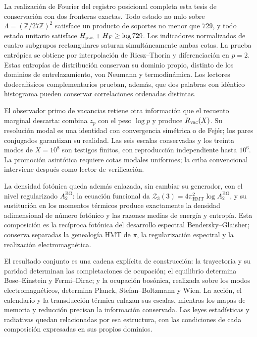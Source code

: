 La realización de Fourier del registro posicional completa esta tesis de
conservación con dos fronteras exactas. Todo estado no nulo sobre
\(\Lambda=(\mathbb Z/27\mathbb Z)^2\) satisface un producto de soportes
no menor que \(729\), y todo estado unitario satisface
\(H_{\rm pos}+H_F\ge\log729\). Los indicadores normalizados de cuatro
subgrupos rectangulares saturan simultáneamente ambas cotas. La prueba
entrópica se obtiene por interpolación de Riesz--Thorin y diferenciación
en \(p=2\). Estas entropías de distribución conservan su dominio propio,
distinto de los dominios de entrelazamiento, von Neumann y termodinámica.
Los lectores dodecafásicos complementarios prueban, además, que dos
palabras con idéntico histograma pueden conservar correlaciones ordenadas
distintas.

El observador primo de vacancias retiene otra información que el recuento
marginal descarta: combina \(z_p\) con el peso \(\log p\) y produce
\(R_{\rm vac}(X)\). Su resolución modal es una identidad con convergencia
simétrica o de Fejér; los pares conjugados garantizan su realidad. Las seis
escalas conservadas y los treinta modos de \(X=10^8\) son testigos finitos,
con reproducción independiente hasta \(10^6\). La promoción asintótica
requiere cotas modales uniformes; la criba convencional interviene después
como lector de verificación.

La densidad fotónica queda además enlazada, sin cambiar su generador, con
el nivel regularizado \(A_2^{\mathrm{BG}}\): la ecuación funcional da
\(\mathcal Z_3(3)=4\pi_{\mathrm{HMT}}^2\log A_2^{\mathrm{BG}}\), y su
sustitución en los momentos térmicos produce exactamente la densidad
adimensional de número fotónico y las razones medias de energía y entropía.
Esta composición es la recíproca fotónica del desarrollo espectral
Bendersky--Glaisher; conserva separadas la genealogía HMT de \(\pi\), la
regularización espectral y la realización electromagnética.


El resultado conjunto es una cadena explícita de construcción:
la trayectoria y su paridad determinan las completaciones de ocupación;
el equilibrio determina Bose--Einstein y Fermi--Dirac; y la ocupación
bosónica, realizada sobre los modos electromagnéticos, determina
Planck, Stefan--Boltzmann y Wien. La acción, el calendario y la
transducción térmica enlazan sus escalas, mientras los mapas de memoria
y reducción precisan la información conservada. Las leyes estadísticas
y radiativas quedan relacionadas por esa estructura, con las
condiciones de cada composición expresadas en sus propios dominios.

\par\endgroup
